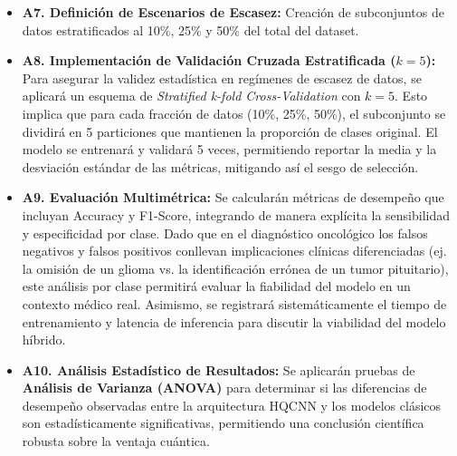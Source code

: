 \documentclass[12pt,letterpaper]{article}
\begin{document}
    \begin{itemize}
        \item \textbf{A7. Definición de Escenarios de Escasez:} Creación de subconjuntos de datos estratificados al 10\%, 25\% y 50\% del total del dataset.
               

        \item \textbf{A8. Implementación de Validación Cruzada Estratificada ($k=5$):} Para asegurar la validez estadística en regímenes de escasez de datos, se aplicará un esquema de \textit{Stratified k-fold Cross-Validation} con $k=5$. Esto implica que para cada fracción de datos (10\%, 25\%, 50\%), el subconjunto se dividirá en 5 particiones que mantienen la proporción de clases original. El modelo se entrenará y validará 5 veces, permitiendo reportar la media y la desviación estándar de las métricas, mitigando así el sesgo de selección.
        

        \item \textbf{A9. Evaluación Multimétrica:} Se calcularán métricas de desempeño que incluyan Accuracy y F1-Score, integrando de manera explícita la sensibilidad y especificidad por clase. Dado que en el diagnóstico oncológico los falsos negativos y falsos positivos conllevan implicaciones clínicas diferenciadas (ej. la omisión de un glioma vs. la identificación errónea de un tumor pituitario), este análisis por clase permitirá evaluar la fiabilidad del modelo en un contexto médico real. Asimismo, se registrará sistemáticamente el tiempo de entrenamiento y latencia de inferencia para discutir la viabilidad del modelo híbrido.
        
        \item \textbf{A10. Análisis Estadístico de Resultados:} Se aplicarán pruebas de \textbf{Análisis de Varianza (ANOVA)} para determinar si las diferencias de desempeño observadas entre la arquitectura HQCNN y los modelos clásicos son estadísticamente significativas, permitiendo una conclusión científica robusta sobre la ventaja cuántica.


\end{itemize}
\end{document}

